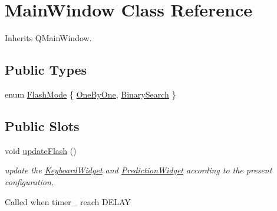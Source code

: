 \hypertarget{class_main_window}{\section{Main\-Window Class Reference}
\label{class_main_window}
}


Inherits Q\-Main\-Window.

\subsection*{Public Types}
\begin{DoxyCompactItemize}
\item 
enum \hyperlink{class_main_window_a44abd7eed6ee23341cb378e6dbf60652}{Flash\-Mode} \{ \hyperlink{class_main_window_a44abd7eed6ee23341cb378e6dbf60652aff8e22f74aaba6a40ec3c140d15b4a56}{One\-By\-One}, 
\hyperlink{class_main_window_a44abd7eed6ee23341cb378e6dbf60652a445b710505a2c84dff02b98a2f1ba11a}{Binary\-Search}
 \}
\end{DoxyCompactItemize}
\subsection*{Public Slots}
\begin{DoxyCompactItemize}
\item 
\hypertarget{class_main_window_a2c60fa94bf903a2fd73fd5ab9c743d61}{void \hyperlink{class_main_window_a2c60fa94bf903a2fd73fd5ab9c743d61}{update\-Flash} ()}\label{class_main_window_a2c60fa94bf903a2fd73fd5ab9c743d61}

\begin{DoxyCompactList}\small\item\em update the \hyperlink{class_keyboard_widget}{Keyboard\-Widget} and \hyperlink{class_prediction_widget}{Prediction\-Widget} according to the present configuration. \par
 Called when timer\-\_\- reach D\-E\-L\-A\-Y \end{DoxyCompactList}\end{DoxyCompactItemize}
